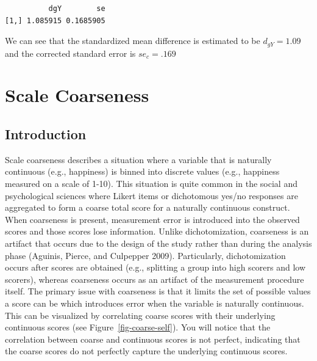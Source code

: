 \documentclass[
  letterpaper,
  DIV=11,
  numbers=noendperiod]{scrreprt}
\newenvironment{Shaded}{}{}
\newcommand{\CommentTok}[1]{\textcolor[rgb]{0.54,0.53,0.53}{#1}}
\newcommand{\FloatTok}[1]{\textcolor[rgb]{0.69,0.50,0.00}{#1}}
\newcommand{\FunctionTok}[1]{\textcolor[rgb]{0.39,0.29,0.61}{#1}}
\newcommand{\NormalTok}[1]{\textcolor[rgb]{0.12,0.11,0.11}{#1}}
\newcommand{\OtherTok}[1]{\textcolor[rgb]{0.00,0.43,0.16}{#1}}
\newcommand{\SpecialCharTok}[1]{\textcolor[rgb]{0.24,0.68,0.91}{#1}}
\begin{document}
\begin{tcolorbox}
\begin{Shaded}
\end{Shaded}

\begin{verbatim}
          dgY        se
[1,] 1.085915 0.1685905
\end{verbatim}

We can see that the standardized mean difference is estimated to be
\(d_{gY}=1.09\) and the corrected standard error is \(se_c=.169\)

\end{tcolorbox}


\chapter{Scale Coarseness}\label{scale-coarseness}

\section{Introduction}\label{introduction-5}

Scale coarseness describes a situation where a variable that is
naturally continuous (e.g., happiness) is binned into discrete values
(e.g., happiness measured on a scale of 1-10). This situation is quite
common in the social and psychological sciences where Likert items or
dichotomous yes/no responses are aggregated to form a coarse total score
for a naturally continuous construct. When coarseness is present,
measurement error is introduced into the observed scores and those
scores lose information. Unlike dichotomization, coarseness is an
artifact that occurs due to the design of the study rather than during
the analysis phase (Aguinis, Pierce, and Culpepper 2009). Particularly,
dichotomization occurs after scores are obtained (e.g., splitting a
group into high scorers and low scorers), whereas coarseness occurs as
an artifact of the measurement procedure itself. The primary issue with
coarseness is that it limits the set of possible values a score can be
which introduces error when the variable is naturally continuous. This
can be visualized by correlating coarse scores with their underlying
continuous scores (see Figure~\ref{fig-coarse-self}). You will notice
that the correlation between coarse and continuous scores is not
perfect, indicating that the coarse scores do not perfectly capture the
underlying continuous scores.
\end{document}
